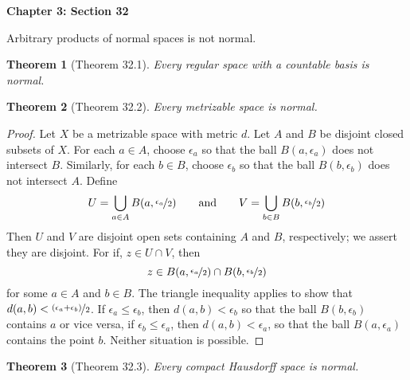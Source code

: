 \documentclass{article}
\newtheorem{theorem}{Theorem}
\theoremstyle{definition}
\theoremstyle{remark}
\begin{document}
    \newpage

    \textbf{Chapter 3: Section 32}

    Arbitrary products of normal spaces is not normal.

    \begin{theorem}[Theorem 32.1]
        Every regular space with a countable basis is normal.
    \end{theorem}

    \begin{theorem}[Theorem 32.2]
        Every metrizable space is normal.
    \end{theorem}
    \begin{proof}
        Let $X$ be a metrizable space with metric $d$. Let $A$ and $B$ be disjoint closed subsets of $X$. For each $a\in A$, choose
        $\epsilon_a$ so that the ball $B(a,\epsilon_a)$ does not intersect $B$. Similarly, for each $b\in B$, choose $\epsilon_b$
        so that the ball $B(b,\epsilon_b)$ does not intersect $A$. Define
        \[ U = \bigcup_{a\in A} B(a,\nicefrac{\epsilon_a}{2})\qquad\text{and}\qquad V=\bigcup_{b\in B}B(b,\nicefrac{\epsilon_b}{2}) \]
        Then $U$ and $V$ are disjoint open sets containing $A$ and $B$, respectively; we assert they are disjoint. For if,
        $z\in U\cap V$, then
        \[ z\in B(a,\nicefrac{\epsilon_a}{2}) \cap B(b,\nicefrac{\epsilon_b}{2}) \]
        for some $a\in A$ and $b\in B$. The triangle inequality applies to show that $d(a,b) < \nicefrac{(\epsilon_a+\epsilon_b)}{2}$.
        If $\epsilon_a\leq \epsilon_b$, then $d(a,b)<\epsilon_b$ so that the ball $B(b,\epsilon_b)$ contains $a$ or vice versa, if
        $\epsilon_b\leq \epsilon_a$, then $d(a,b)<\epsilon_a$, so that the ball $B(a,\epsilon_a)$ contains the point $b$. Neither
        situation is possible.
    \end{proof}

    \begin{theorem}[Theorem 32.3]
        Every compact Hausdorff space is normal.
    \end{theorem}
\end{document}

